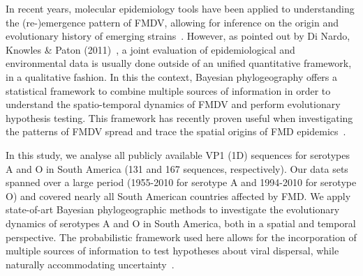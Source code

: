\documentclass[10pt]{article}
\begin{document}
In recent years, molecular epidemiology tools have been applied to understanding the (re-)emergence pattern of FMDV, allowing for inference on the origin and evolutionary history of emerging strains~\cite{Perez2001,Malirat2007,andean,Malirat2011,Maradei2013}.
However, as pointed out by Di Nardo, Knowles \&  Paton (2011)~\cite{combining}, a joint evaluation of epidemiological and environmental data is usually done outside of an unified quantitative framework, in a qualitative fashion.
In this the context, Bayesian phylogeography offers a statistical framework to combine multiple sources of information in order to understand the spatio-temporal dynamics of FMDV and perform evolutionary hypothesis testing.
This framework has recently proven useful when investigating the patterns of FMDV spread and trace the spatial origins of FMD epidemics~\cite{Carvalho2013,bulgaria,phymal,hall2013}.

In this study, we analyse all publicly available VP1 (1D) sequences for serotypes A and O in South America (131 and 167 sequences, respectively).
Our data sets spanned over a large period (1955-2010 for serotype A and 1994-2010 for serotype O)  and covered nearly all South American countries affected by FMD.
We apply state-of-art Bayesian phylogeographic methods to investigate the evolutionary dynamics of serotypes A and O in South America, both in a spatial and temporal perspective.
The probabilistic framework used here allows for the incorporation of multiple sources of information to test hypotheses about viral dispersal, while naturally accommodating uncertainty~\cite{roots,towards}.
\end{document}
